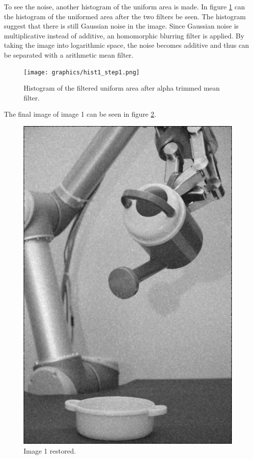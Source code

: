 To see the noise, another histogram of the uniform area is made.
In figure \ref{fig:hist_img1_after_alpha} can the histogram of the uniformed area after the two filters be seen.
The histogram suggest that there is still Gaussian noise in the image.
Since Gaussian noise is multiplicative instead of additive, an homomorphic blurring filter is applied.
By taking the image into logarithmic space, the noise becomes additive and thus can be separated with a arithmetic mean filter.

\begin{figure}[H]
\texttt{[image: graphics/hist1\_step1.png]}
\caption{Histogram of the filtered uniform area after alpha trimmed mean filter.}
\label{fig:hist_img1_after_alpha}
\end{figure}

The final image of image 1 can be seen in figure \ref{fig:final_image1}.

\begin{figure}[H]
\centering
\includegraphics[width = 0.8 \linewidth]{../code/images/image_result_1.png}
\caption{Image 1 restored.}
\label{fig:final_image1}
\end{figure}
